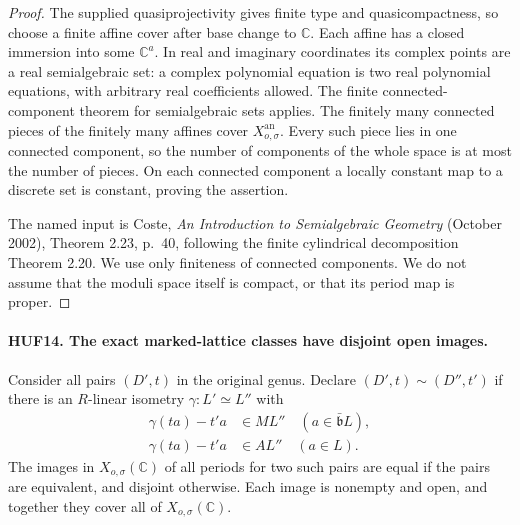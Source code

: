 \begin{proof}
The supplied quasiprojectivity gives finite type and
quasicompactness, so choose a finite affine cover after
base change to \(\mathbb C\).  Each affine has a closed
immersion into some \(\mathbb C^a\).  In real and
imaginary coordinates its complex points are a real
semialgebraic set: a complex polynomial equation is
two real polynomial equations, with arbitrary real
coefficients allowed.  The finite connected-component
theorem for semialgebraic sets applies.
The finitely many connected pieces of the finitely
many affines cover \(X_{o,\sigma}^{\mathrm{an}}\).
Every such piece lies in one connected component,
so the number of components of the whole space is
at most the number of pieces.  On each connected
component a locally constant map to a discrete set
is constant, proving the assertion.

The named input is Coste, \emph{An Introduction to
Semialgebraic Geometry} (October 2002), Theorem 2.23,
p.\ 40, following the finite cylindrical decomposition
Theorem 2.20.  We use only finiteness of connected
components.  We do not assume that the moduli space
itself is compact, or that its period map is proper.
\end{proof}

\paragraph{HUF14. The exact marked-lattice classes have disjoint open images.}
\label{claim:HUF14}
Consider all pairs \((D',t)\) in the original genus.
Declare \((D',t)\sim(D'',t')\) if there is an
\(R\)-linear isometry \(\gamma:L'\simeq L''\) with
\[
 \begin{split}
 \gamma(ta)-t'a&\in ML''\quad(a\in\bar{\mathfrak b}L),\\
 \gamma(ta)-t'a&\in AL''\quad(a\in L).
 \end{split}                                                     \tag{HUF.10}
\]
The images in \(X_{o,\sigma}(\mathbb C)\) of all periods
for two such pairs are equal if the pairs are equivalent,
and disjoint otherwise.  Each image is nonempty and open,
and together they cover all of \(X_{o,\sigma}(\mathbb C)\).

